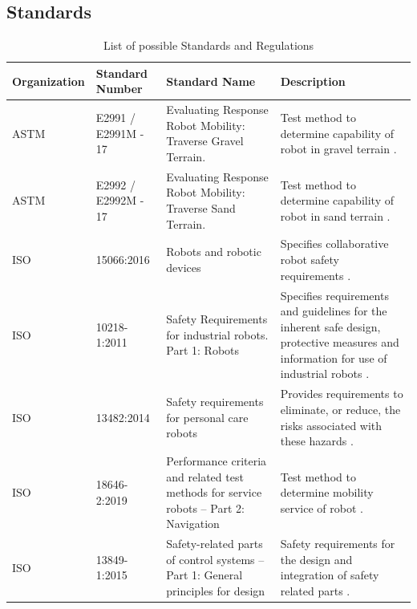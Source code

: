 \renewcommand\thefigure{\thesection.\arabic{figure}} %
\renewcommand\thetable{\thesection.\arabic{table}} %
\setcounter{figure}{0}
\setcounter{table}{0}

\subsection{Standards} \label{app:standards}

\begin{center}
    \begin{longtable}{ | p{2.2cm} | p{2.5cm} | p{4cm} |p{6cm}|}
        \caption{List of possible Standards and Regulations}
        \label{table:standards}
        \\ \hline
        Organization & Standard Number & Standard Name & Description
        \\ \hline
        ASTM & E2991 / E2991M - 17 & Evaluating Response Robot Mobility: Traverse Gravel Terrain. & Test method to determine capability of robot in gravel terrain \cite{astm_standard_nodate}.
         \\ \hline
        ASTM & E2992 / E2992M - 17 & Evaluating Response Robot Mobility: Traverse Sand Terrain. & Test method to determine capability of robot in sand terrain \cite{astm_standard_nodate-1}.
        \\ \hline
        ISO & 15066:2016 & Robots and robotic devices & Specifies collaborative robot safety requirements \cite{iso_iso/ts_nodate}.
        \\ \hline
        ISO & 10218-1:2011 & Safety Requirements for industrial robots. Part 1: Robots & Specifies requirements and guidelines for the inherent safe design, protective measures and information for use of industrial robots \cite{iso_iso_nodate-1}.
        \\ \hline
        ISO & 13482:2014 & Safety requirements for personal care robots & Provides requirements to eliminate, or reduce, the risks associated with these hazards \cite{iso_iso_nodate}.
        \\ \hline
        ISO & 18646-2:2019 & Performance criteria and related test methods for service robots -- Part 2: Navigation & Test method to determine mobility service of robot \cite{iso_iso_nodate-2}.
        \\ \hline
        ISO & 13849-1:2015 & Safety-related parts of control systems -- Part 1: General principles for design & Safety requirements for the design and integration of safety related parts \cite{iso_iso_nodate-3}.

\end{longtable}
\end{center}
